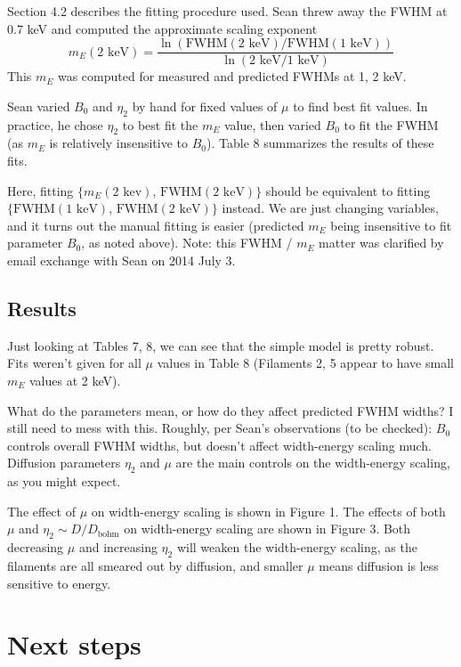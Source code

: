 \documentclass[10pt]{article}
\newcommand{\mt}{\mathrm}
\begin{document}
Section 4.2 describes the fitting procedure used.  Sean threw away the FWHM at
0.7 keV and computed the approximate scaling exponent
\[
    m_E(\text{2 keV}) = \frac{ \ln( \mathrm{FWHM}(\text{2 keV}) /
                                    \mathrm{FWHM}(\text{1 keV}) ) }
                             { \ln( \text{2 keV} / \text{1 keV} ) }
\]
This $m_E$ was computed for measured and predicted FWHMs at 1, 2 keV.

Sean varied $B_0$ and $\eta_2$ by hand for fixed values of $\mu$ to find best
fit values.  In practice, he chose $\eta_2$ to best fit the $m_E$ value, then
varied $B_0$ to fit the FWHM (as $m_E$ is relatively insensitive to $B_0$).
Table 8 summarizes the results of these fits.

Here, fitting $\{m_E(\text{2 kev})$, $\mathrm{FWHM}(\text{2 keV})\}$ should be
equivalent to fitting $\{\mathrm{FWHM}(\text{1 keV})$,
$\mathrm{FWHM}(\text{2 keV})\}$ instead.  We are just changing variables, and
it turns out the manual fitting is easier (predicted $m_E$ being insensitive to
fit parameter $B_0$, as noted above).  Note: this FWHM / $m_E$ matter was
clarified by email exchange with Sean on 2014 July 3.

\subsection{Results}

Just looking at Tables 7, 8, we can see that the simple model is pretty robust.
Fits weren't given for all $\mu$ values in Table 8 (Filaments 2, 5 appear to
have small $m_E$ values at 2 keV).

What do the parameters mean, or how do they affect predicted FWHM widths?
I still need to mess with this.  Roughly, per Sean's observations (to be
checked): $B_0$ controls overall FWHM widths, but doesn't affect width-energy
scaling much.  Diffusion parameters $\eta_2$ and $\mu$ are the main controls on
the width-energy scaling, as you might expect.

The effect of $\mu$ on width-energy scaling is shown in Figure 1.
The effects of both $\mu$ and $\eta_2 \sim D/D_{\mt{bohm}}$ on width-energy
scaling are shown in Figure 3.  Both decreasing $\mu$ and increasing $\eta_2$
will weaken the width-energy scaling, as the filaments are all smeared out by
diffusion, and smaller $\mu$ means diffusion is less sensitive to energy.

\section{Next steps}
\end{document}
